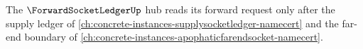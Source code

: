 The $\ForwardSocketLedgerUp$ hub reads its forward request only after the supply ledger of \autoref{ch:concrete-instances-supplysocketledger-namecert} and the far-end boundary of \autoref{ch:concrete-instances-apophaticfarendsocket-namecert}.




